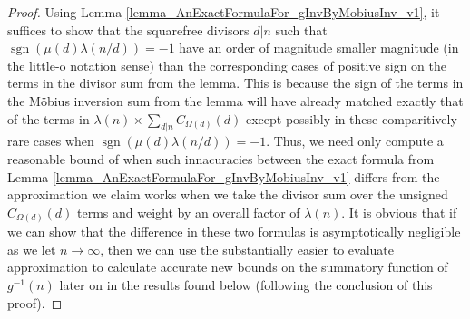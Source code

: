 \documentclass[11pt,reqno,a4letter]{article}
\numberwithin{figure}{section}
\numberwithin{table}{section}
\theoremstyle{plain}
\numberwithin{theorem}{section}
\theoremstyle{definition}
\begin{document}
\begin{proof} 
Using Lemma \ref{lemma_AnExactFormulaFor_gInvByMobiusInv_v1}, it suffices to show that 
the squarefree divisors $d|n$ such that $\operatorname{sgn}(\mu(d) \lambda(n/d)) = -1$ 
have an order of magnitude smaller magnitude (in the little-o notation sense) 
than the corresponding cases of positive sign on 
the terms in the divisor sum from the lemma. 
This is because the sign of the terms in the M\"obius inversion sum from the lemma will 
have already matched exactly that 
of the terms in $\lambda(n) \times \sum_{d|n} C_{\Omega(d)}(d)$ except possibly in these 
comparitively rare cases when $\operatorname{sgn}(\mu(d) \lambda(n/d)) = -1$. 
Thus, we need only compute a reasonable bound of when such innacuracies between the exact formula from 
Lemma \ref{lemma_AnExactFormulaFor_gInvByMobiusInv_v1} differs from the approximation we claim 
works when we take the divisor sum over the unsigned $C_{\Omega(d)}(d)$ terms and weight by an 
overall factor of $\lambda(n)$. It is obvious that if we can show that the difference in these 
two formulas is asymptotically negligible as we let $n \rightarrow \infty$, then we can use the 
substantially easier to evaluate approximation to calculate accurate new bounds on the summatory 
function of $g^{-1}(n)$ later on in the results found below (following the conclusion of this proof). 


\end{proof}
\end{document}
